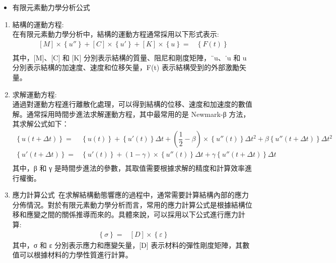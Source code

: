 \begin{itemize}
\item 有限元素動力學分析公式
\end{itemize}
\begin{enumerate}
\item 結構的運動方程:\\
在有限元素動力學分析中，結構的運動方程通常採用以下形式表示:\
\[
\begin{aligned}
\left[ M\right] \times \left\{ u''\right\} +\left[ C\right] \times \left\{ u'\right\} +\left[ K\right] \times \left\{ u\right\}=&\left\{ F\left( t\right) \right\}\\
\end{aligned}
\]
其中，[M]、[C] 和 [K] 分別表示結構的質量、阻尼和剛度矩陣，{¨u}、{˙u} 和 {u} 分別表示結構的加速度、速度和位移矢量，{F(t)} 表示結構受到的外部激勵矢量。\

\item 求解運動方程:\\
通過對運動方程進行離散化處理，可以得到結構的位移、速度和加速度的數值解。通常採用時間步進法求解運動方程，其中最常用的是 Newmark-β 方法，其求解公式如下：\
\[
\begin{aligned}
\left\{ u\left( t+\Delta t\right) \right\}=&\left\{ u\left( t\right) \right\} +\left\{ u'\left( t\right) \right\} \Delta t+\left( \dfrac{1}{2}-\beta \right) \times \left\{ u''\left( t\right) \right\} \Delta t^{2}+\beta \left\{ u''\left( t+\Delta t\right) \right\} \Delta t^{2}\\
\left\{ u'\left( t+\Delta t\right) \right\}=&\left\{ u'\left( t\right) \right\} +\left( 1-\gamma \right) \times \left\{ u''\left( t\right) \right\} \Delta t+\gamma \left\{ u''\left( t+\Delta t\right) \right\} \Delta t\\
\end{aligned}
\]
其中，β 和 γ 是時間步進法的參數，其取值需要根據求解的精度和計算效率進行權衡。\

\item 應力計算公式\
在求解結構動態響應的過程中，通常需要計算結構內部的應力分佈情況。對於有限元素動力學分析而言，常用的應力計算公式是根據結構位移和應變之間的關係推導而來的。具體來說，可以採用以下公式進行應力計算:\
\[
\begin{aligned}
\left\{ \sigma \right\}=&\left[ D\right] \times \left\{ \varepsilon \right\}
\end{aligned}
\]
其中，{σ} 和 {ε} 分別表示應力和應變矢量，[D] 表示材料的彈性剛度矩陣，其數值可以根據材料的力學性質進行計算。

\end{enumerate}

